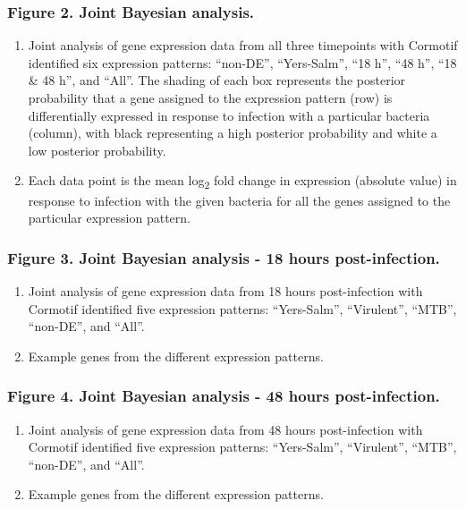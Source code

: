 \subsubsection{Figure 2. Joint Bayesian
analysis.}\label{figure-2.-joint-bayesian-analysis.}

\begin{enumerate}
\def\labelenumi{(\Alph{enumi})}
\itemsep1pt\parskip0pt
\item
  Joint analysis of gene expression data from all three timepoints with
  Cormotif \citep{Wei2015} identified six expression patterns:
  ``non-DE'', ``Yers-Salm'', ``18 h'', ``48 h'', ``18 \& 48 h'', and
  ``All''. The shading of each box represents the posterior probability
  that a gene assigned to the expression pattern (row) is differentially
  expressed in response to infection with a particular bacteria
  (column), with black representing a high posterior probability and
  white a low posterior probability.
\item
  Each data point is the mean log\textsubscript{2} fold change in
  expression (absolute value) in response to infection with the given
  bacteria for all the genes assigned to the particular expression
  pattern.
\end{enumerate}

\subsubsection{Figure 3. Joint Bayesian analysis - 18 hours
post-infection.}\label{figure-3.-joint-bayesian-analysis---18-hours-post-infection.}

\begin{enumerate}
\def\labelenumi{(\Alph{enumi})}
\itemsep1pt\parskip0pt
\item
  Joint analysis of gene expression data from 18 hours post-infection
  with Cormotif identified five expression patterns: ``Yers-Salm'',
  ``Virulent'', ``MTB'', ``non-DE'', and ``All''.
\item
  Example genes from the different expression patterns.
\end{enumerate}

\subsubsection{Figure 4. Joint Bayesian analysis - 48 hours
post-infection.}\label{figure-4.-joint-bayesian-analysis---48-hours-post-infection.}

\begin{enumerate}
\def\labelenumi{(\Alph{enumi})}
\itemsep1pt\parskip0pt
\item
  Joint analysis of gene expression data from 48 hours post-infection
  with Cormotif identified five expression patterns: ``Yers-Salm'',
  ``Virulent'', ``MTB'', ``non-DE'', and ``All''.
\item
  Example genes from the different expression patterns.
\end{enumerate}

